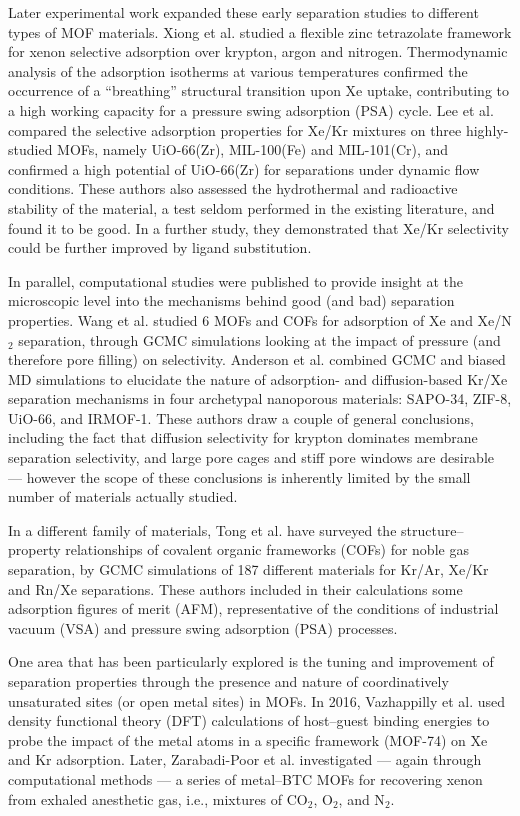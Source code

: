 \documentclass[main.tex]{subfiles}
\begin{document}
Later experimental work expanded these early separation studies to different types of MOF materials. Xiong et al.\cite{Xiong_2015} studied a flexible zinc tetrazolate framework for xenon selective adsorption over krypton, argon and nitrogen. Thermodynamic analysis of the adsorption isotherms at various temperatures confirmed the occurrence of a ``breathing'' structural transition upon Xe uptake, contributing to a high working capacity for a pressure swing adsorption (PSA) cycle. Lee et al.\cite{Lee_2016} compared the selective adsorption properties for Xe/Kr mixtures on three highly-studied MOFs, namely UiO-66(Zr), MIL-100(Fe) and MIL-101(Cr), and confirmed a high potential of UiO-66(Zr) for separations under dynamic flow conditions. These authors also assessed the hydrothermal and radioactive stability of the material, a test seldom performed in the existing literature, and found it to be good. In a further study,\cite{Lee_2018} they demonstrated that Xe/Kr selectivity could be further improved by ligand substitution.

In parallel, computational studies were published to provide insight at the microscopic level into the mechanisms behind good (and bad) separation properties. Wang et al.\cite{Wang_2014} studied 6 MOFs and COFs for adsorption of Xe and Xe/N$_2$ separation, through GCMC simulations looking at the impact of pressure (and therefore pore filling) on selectivity. Anderson et al.\cite{Anderson_2017} combined GCMC and biased MD simulations to elucidate the nature of adsorption- and diffusion-based Kr/Xe separation mechanisms in four archetypal nanoporous materials: SAPO-34, ZIF-8, UiO-66, and IRMOF-1. These authors draw a couple of general conclusions, including the fact that diffusion selectivity for krypton dominates membrane separation selectivity, and large pore cages and stiff pore windows are desirable --- however the scope of these conclusions is inherently limited by the small number of materials actually studied.

In a different family of materials, Tong et al.\cite{Tong_2017} have surveyed the structure--property relationships of covalent organic frameworks (COFs) for noble gas separation, by GCMC simulations of 187 different materials for Kr/Ar, Xe/Kr and Rn/Xe separations. These authors included in their calculations some adsorption figures of merit (AFM), representative of the conditions of industrial vacuum (VSA) and pressure swing adsorption (PSA) processes.

One area that has been particularly explored is the tuning and improvement of separation properties through the presence and nature of coordinatively unsaturated sites (or open metal sites) in MOFs. In 2016, Vazhappilly et al.\cite{Vazhappilly_2016} used density functional theory (DFT) calculations of host--guest binding energies to probe the impact of the metal atoms in a specific framework (MOF-74) on Xe and Kr adsorption. Later, Zarabadi-Poor et al.\cite{ZarabadiPoor_2018} investigated --- again through computational methods --- a series of metal--BTC MOFs for recovering xenon from exhaled anesthetic gas, i.e., mixtures of CO$_2$, O$_2$, and N$_2$.
\end{document}
